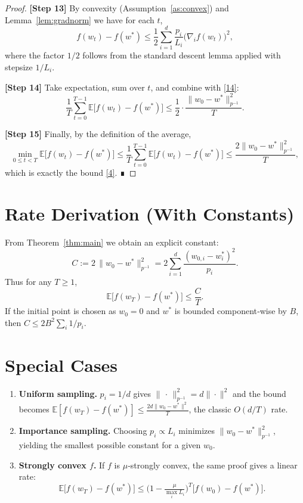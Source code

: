 \documentclass{article}
\newcommand{\E}{\mathbb{E}}
\begin{document}
\begin{proof}
\textbf{[Step 13]} By convexity (Assumption~\ref{as:convex}) and Lemma~\ref{lem:gradnorm} we have for each $t$,
\[
f(w_t)-f(w^{*})\le
\frac{1}{2}\sum_{i=1}^{d}\frac{p_i}{L_i}\bigl(\nabla_i f(w_t)\bigr)^{2},
\tag{15}
\]
where the factor $1/2$ follows from the standard descent lemma applied with stepsize $1/L_i$.

\textbf{[Step 14]} Take expectation, sum over $t$, and combine with \eqref{14}:
\[
\frac{1}{T}\sum_{t=0}^{T-1}\E\!\bigl[f(w_t)-f(w^{*})\bigr]
\le \frac{1}{2}\cdot\frac{\|w_0-w^{*}\|_{p^{-1}}^{2}}{T}.
\tag{16}
\]

\textbf{[Step 15]} Finally, by the definition of the average,
\[
\min_{0\le t<T}\E\!\bigl[f(w_t)-f(w^{*})\bigr]
\le \frac{1}{T}\sum_{t=0}^{T-1}\E\!\bigl[f(w_t)-f(w^{*})\bigr]
\le \frac{2\|w_0-w^{*}\|_{p^{-1}}^{2}}{T},
\]
which is exactly the bound \eqref{4}.  ∎
\end{proof}

\section*{Rate Derivation (With Constants)}
From Theorem~\ref{thm:main} we obtain an explicit constant:
\[
C:=2\,\|w_0-w^{*}\|_{p^{-1}}^{2}
=2\sum_{i=1}^{d}\frac{(w_{0,i}-w^{*}_i)^{2}}{p_i}.
\]
Thus for any $T\ge1$,
\[
\E\!\bigl[f(w_T)-f(w^{*})\bigr]\le \frac{C}{T}.
\]
If the initial point is chosen as $w_0=0$ and $w^{*}$ is bounded component‑wise by $B$, then $C\le 2B^{2}\sum_{i}1/p_i$.

\section*{Special Cases}
\begin{enumerate}[label=\alph*.]
\item \textbf{Uniform sampling.} $p_i=1/d$ gives $\|\,\cdot\,\|_{p^{-1}}^{2}=d\|\cdot\|^{2}$ and the bound becomes $\displaystyle \E[f(w_T)-f(w^{*})]\le \frac{2d\|w_0-w^{*}\|^{2}}{T}$, the classic $O(d/T)$ rate.
\item \textbf{Importance sampling.} Choosing $p_i\propto L_i$ minimizes $\|w_0-w^{*}\|_{p^{-1}}^{2}$, yielding the smallest possible constant for a given $w_0$.
\item \textbf{Strongly convex $f$.} If $f$ is $\mu$‑strongly convex, the same proof gives a linear rate:
\[
\E\!\bigl[f(w_T)-f(w^{*})\bigr]\le
\bigl(1-\tfrac{\mu}{\max_i L_i}\bigr)^{T}
\bigl[f(w_0)-f(w^{*})\bigr].
\]
\end{enumerate}
\end{document}
